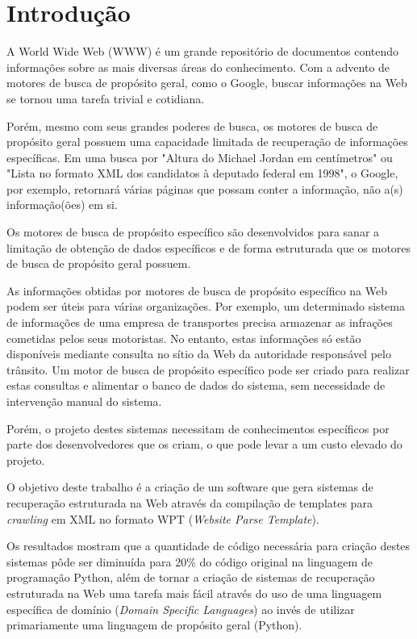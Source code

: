 \chapter{Introdução}

A World Wide Web (WWW) é um grande repositório de documentos contendo informações sobre as mais diversas áreas do conhecimento. Com a advento de motores de busca de propósito geral, como o Google, buscar informações na Web se tornou uma tarefa trivial e cotidiana.

Porém, mesmo com seus grandes poderes de busca, os motores de busca de propósito geral possuem uma capacidade limitada de recuperação de informações específicas. Em uma busca por "Altura do Michael Jordan em centímetros" ou "Lista no formato XML dos candidatos à deputado federal em 1998", o Google, por exemplo, retornará várias páginas que possam conter a informação, não a(s) informação(ões) em si.

Os motores de busca de propósito específico são desenvolvidos para sanar a limitação de obtenção de dados específicos e de forma estruturada que os motores de busca de propósito geral possuem.

As informações obtidas por motores de busca de propósito específico na Web podem ser úteis para várias organizações. Por exemplo, um determinado sistema de informações de uma empresa de transportes precisa armazenar as infrações cometidas pelos seus motoristas. No entanto, estas informações só estão disponíveis mediante consulta no sítio da Web da autoridade responsável pelo trânsito. Um motor de busca de propósito específico pode ser criado para realizar estas consultas e alimentar o banco de dados do sistema, sem necessidade de intervenção manual do sistema.

Porém, o projeto destes sistemas necessitam de conhecimentos específicos por parte dos desenvolvedores que os criam, o que pode levar a um custo elevado do projeto.

O objetivo deste trabalho é a criação de um software que gera sistemas de recuperação estruturada na Web através da compilação de templates para \emph{crawling} em XML no formato WPT (\emph{Website Parse Template}).

Os resultados mostram que a quantidade de código necessária para criação destes sistemas pôde ser diminuída para 20\% do código original na linguagem de programação Python, além de tornar a criação de sistemas de recuperação estruturada na Web uma tarefa mais fácil através do uso de uma linguagem específica de domínio (\emph{Domain Specific Languages}) ao invés de utilizar primariamente uma linguagem de propósito geral (Python).

